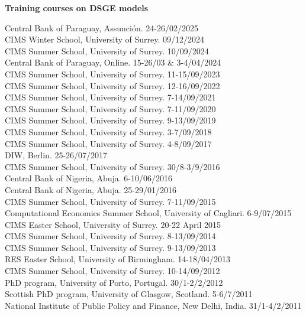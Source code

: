 \documentclass[margin, 11pt]{res} %
\begin{document}
\begin{resume}

\textbf{Training courses on DSGE models}

Central Bank of Paraguay, Assunción. \hfill 24-26/02/2025 \\
CIMS Winter School, University of Surrey. \hfill 09/12/2024 \\
CIMS Summer School, University of Surrey. \hfill 10/09/2024 \\
Central Bank of Paraguay, Online. \hfill 15-26/03 \& 3-4/04/2024 \\
CIMS Summer School, University of Surrey. \hfill 11-15/09/2023 \\
CIMS Summer School, University of Surrey. \hfill 12-16/09/2022 \\
CIMS Summer School, University of Surrey. \hfill 7-14/09/2021 \\
CIMS Summer School, University of Surrey. \hfill 7-11/09/2020 \\
CIMS Summer School, University of Surrey. \hfill 9-13/09/2019 \\
CIMS Summer School, University of Surrey. \hfill 3-7/09/2018 \\
CIMS Summer School, University of Surrey. \hfill 4-8/09/2017\\
DIW, Berlin. \hfill 25-26/07/2017 \\
CIMS Summer School, University of Surrey. \hfill 30/8-3/9/2016\\
Central Bank of Nigeria, Abuja. \hfill 6-10/06/2016 \\
Central Bank of Nigeria, Abuja. \hfill 25-29/01/2016\\
CIMS Summer School, University of Surrey. \hfill 7-11/09/2015\\
Computational Economics Summer School, University of Cagliari. \hfill 6-9/07/2015\\
CIMS Easter School, University of Surrey. \hfill 20-22 April 2015\\
CIMS Summer School, University of Surrey. \hfill 8-13/09/2014\\
CIMS Summer School, University of Surrey. \hfill 9-13/09/2013\\
RES Easter School, University of Birmingham. \hfill 14-18/04/2013\\
CIMS Summer School, University of Surrey. \hfill 10-14/09/2012 \\
PhD program, University of Porto, Portugal. \hfill 30/1-2/2/2012\\
Scottish PhD program, University of Glasgow, Scotland. \hfill 5-6/7/2011\\
National Institute of Public Policy and Finance, New Delhi, India. \hfill 31/1-4/2/2011


\end{resume}
\end{document}
